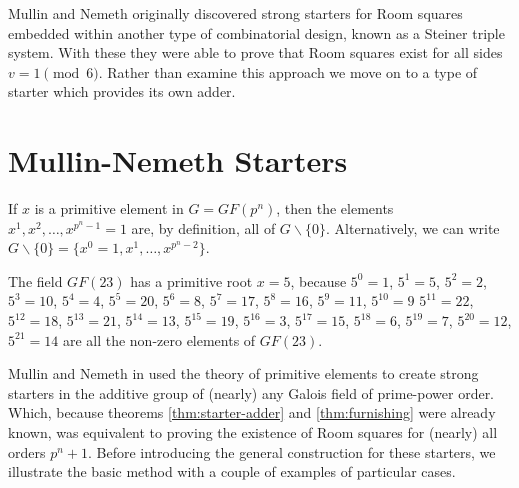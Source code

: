 Mullin and Nemeth originally discovered strong starters for Room squares embedded within another type of combinatorial design, known as a Steiner triple system.
With these they were able to prove that Room squares exist for all sides
$v = 1\pmod 6$.
Rather than examine this approach we move on to a type of starter which provides its own adder.

\section{Mullin-Nemeth Starters}
\label{sec:mullin-nemeth}

If $x$ is a primitive element in $G = GF(p^n)$, then the elements $x^1, x^2, \ldots, x^{p^n - 1} = 1$ are, by definition, all of $G \backslash \{0\}$.
Alternatively, we can write $G \backslash \{0\} = \{x^0 = 1, x^1, \ldots, x^{p^n - 2}\}$.

\begin{example}
\label{eg:mullin-nemeth}
The field $GF(23)$ has a primitive root $x = 5$, because $5^0 = 1$, $5^1 = 5$, $5^2 = 2$, $5^3 = 10$, $5^4 = 4$, $5^5 = 20$, $5^6 = 8$, $5^7 = 17$, $5^8 = 16$, $5^9 = 11$, $5^{10} = 9$ $5^{11} = 22$, $5^{12} = 18$, $5^{13} = 21$, $5^{14} = 13$, $5^{15} = 19$, $5^{16} = 3$, $5^{17} = 15$, $5^{18} = 6$, $5^{19} = 7$, $5^{20} = 12$, $5^{21} = 14$ are all the non-zero elements of $GF(23)$.
\end{example}

Mullin and Nemeth in
\cite{mullinFurnishingRoomSquares1969}
used the theory of primitive elements to create strong starters in the additive group of (nearly) any Galois field of prime-power order.
Which, because theorems
\ref{thm:starter-adder}
and
\ref{thm:furnishing}
were already known, was equivalent to proving the existence of Room squares for (nearly) all orders $p^n + 1$.
Before introducing the general construction for these starters, we illustrate the basic method with a couple of examples of particular cases.

